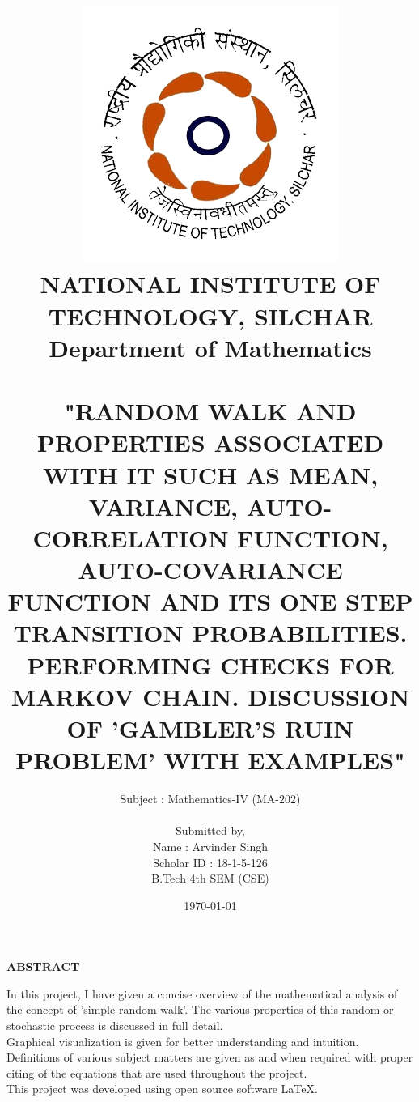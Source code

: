 \documentclass[12pt,a4paper]{article}%
\begin{document}
	
	
	\begin{titlepage}
	\title{\includegraphics[width=0.38 \textwidth]{./NIT_Silchar_logo.png}\\\textbf{\large NATIONAL INSTITUTE OF TECHNOLOGY, SILCHAR}\\\textbf{{\large Department of Mathematics}}\\\\\bigskip\textbf{{\normalsize "RANDOM WALK AND PROPERTIES ASSOCIATED WITH IT SUCH AS MEAN, VARIANCE, AUTO-CORRELATION FUNCTION, AUTO-COVARIANCE FUNCTION AND ITS ONE STEP TRANSITION PROBABILITIES. PERFORMING CHECKS FOR MARKOV CHAIN. DISCUSSION OF 'GAMBLER'S RUIN PROBLEM' WITH EXAMPLES" }}}
	\author{Subject : Mathematics-IV (MA-$202$)\\\\ Submitted by,\\Name : Arvinder Singh\\Scholar ID : 18-1-5-126\\B.Tech 4th SEM (CSE)}
	\date{\today}
	\clearpage\maketitle
	\thispagestyle{empty}
	\end{titlepage}
	
	\begin{center}
		\textbf{\large ABSTRACT}
	\end{center}
    \begin{flushleft}
    	\fontsize{12pt}{18pt}\selectfont
    	 In this project, I have given a concise overview of the mathematical analysis of the concept of 'simple random walk'. The various properties of this random or stochastic process is discussed in full detail.\\\smallskip
    	 Graphical visualization is given for better understanding and intuition. Definitions of various subject matters are given as and when required with proper citing of the equations that are used throughout the project.\\\smallskip
    	 This project was developed using open source software \LaTeX.
	\end{flushleft}
	
\end{document}

